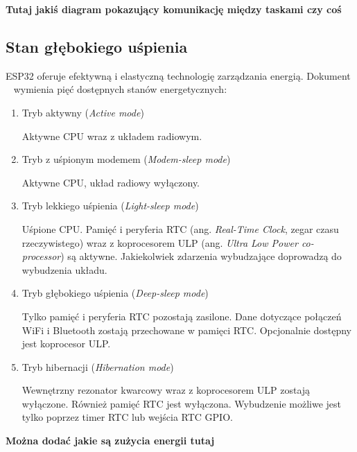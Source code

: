             \textbf{Tutaj jakiś diagram pokazujący komunikację między taskami czy coś}

        \subsection{Stan głębokiego uśpienia}

            ESP32 oferuje efektywną i elastyczną technologię zarządzania energią. Dokument ~\cite{esp32-ds} wymienia pięć dostępnych stanów energetycznych:

            \begin{enumerate}
                \item Tryb aktywny (\textit{Active mode})

                    Aktywne CPU wraz z układem radiowym.

                \item Tryb z uśpionym modemem (\textit{Modem-sleep mode})

                    Aktywne CPU, układ radiowy wyłączony.
                
                \item Tryb lekkiego uśpienia (\textit{Light-sleep mode})

                    Uśpione CPU. Pamięć i peryferia RTC (ang. \textit{Real-Time Clock}, zegar czasu rzeczywistego) wraz z koprocesorem ULP (ang. \textit{Ultra Low Power co-processor}) są aktywne. Jakiekolwiek zdarzenia wybudzające doprowadzą do wybudzenia układu.

                \item Tryb głębokiego uśpienia (\textit{Deep-sleep mode})

                    Tylko pamięć i peryferia RTC pozostają zasilone. Dane dotyczące połączeń WiFi i Bluetooth zostają przechowane w pamięci RTC. Opcjonalnie dostępny jest koprocesor ULP.

                \item Tryb hibernacji (\textit{Hibernation mode})

                    Wewnętrzny rezonator kwarcowy wraz z koprocesorem ULP zostają wyłączone. Również pamięć RTC jest wyłączona. Wybudzenie możliwe jest tylko poprzez timer RTC lub wejścia RTC GPIO.

            \end{enumerate}

            \textbf{Można dodać jakie są zużycia energii tutaj}

